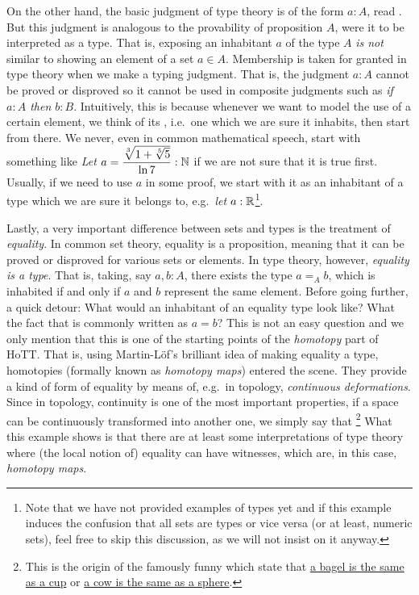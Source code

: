 On the other hand, the basic judgment of type theory is of the form $ a : A $,
read . But this judgment is analogous
to the provability of proposition $ A $, were it to be interpreted as a type.
That is, exposing an inhabitant $ a $ of the type $ A $ \emph{is not} similar to
showing an element of a set $ a \in A $. Membership is taken for granted in type
theory when we make a typing judgment. That is, the judgment $ a : A $ cannot
be proved or disproved so it cannot be used in composite judgments such as
\emph{if $ a : A $ then $ b : B $}. Intuitively, this is because whenever we
want to model the use of a certain element, we think of its ,
i.e.\ one which we are sure it inhabits, then start from there. We never,
even in common mathematical speech, start with something like
\emph{Let $ a = \dfrac{\sqrt[3]{1 + \sqrt[5]{5}}}{\ln 7} : \mathbb{N} $} if we are not sure
that it is true first. Usually, if we need to use $ a $ in some proof,
we start with it as an inhabitant of a type which we are sure it belongs to,
e.g.\ \emph{let $ a : \mathbb{R} $}\footnote{Note that we have not provided examples
  of types yet and if this example induces the confusion that all sets are
  types or vice versa (or at least, numeric sets), feel free to skip this
  discussion, as we will not insist on it anyway.}.

Lastly, a very important difference between sets and types is the treatment
of \emph{equality}. In common set theory, equality is a proposition, meaning
that it can be proved or disproved for various sets or elements. In type theory,
however, \emph{equality is a type}. That is, taking, say $ a, b : A $, there
exists the type $ a =_A b $, which is inhabited if and only if $ a $ and $ b $
represent the same element. Before going further, a quick detour: What would
an inhabitant of an equality type look like? What  the fact
that is commonly written as $ a = b $? This is not an easy question and we only
mention that this is one of the starting points of the \emph{homotopy} part of
HoTT. That is, using Martin-L\"{o}f's brilliant idea of making equality a type,
homotopies (formally known as \emph{homotopy maps}) entered the scene. They
provide a kind of  form of equality by means of, e.g.\ in topology,
\emph{continuous deformations}. Since in topology, continuity is one of the
most important properties, if a space can be continuously transformed into
another one, we simply say that \footnote{This is the
  origin of the famously funny  which state that
  \href{https://upload.wikimedia.org/wikipedia/commons/2/26/Mug\_and\_Torus\_morph.gif}{%
    a bagel is the same as a cup} or
  \href{https://upload.wikimedia.org/wikipedia/commons/2/24/Spot\_the\_cow.gif}{%
    a cow is the same as a sphere}.}
What this example shows is that there are at least some interpretations of
type theory where (the local notion of) equality can have witnesses, which
are, in this case, \emph{homotopy maps}.

